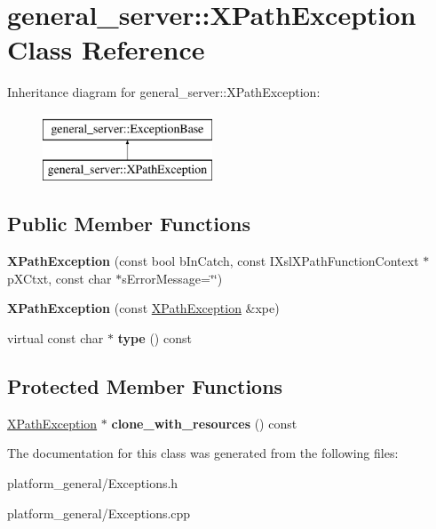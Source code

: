 \hypertarget{classgeneral__server_1_1XPathException}{\section{general\-\_\-server\-:\-:\-X\-Path\-Exception \-Class \-Reference}
\label{classgeneral__server_1_1XPathException}
}
\-Inheritance diagram for general\-\_\-server\-:\-:\-X\-Path\-Exception\-:\begin{figure}[H]
\begin{center}
\leavevmode
\includegraphics[height=2.000000cm]{classgeneral__server_1_1XPathException}
\end{center}
\end{figure}
\subsection*{\-Public \-Member \-Functions}
\begin{DoxyCompactItemize}
\item 
\hypertarget{classgeneral__server_1_1XPathException_a34236687e06c1423e9ea97a372f0600d}{{\bfseries \-X\-Path\-Exception} (const bool b\-In\-Catch, const \-I\-Xsl\-X\-Path\-Function\-Context $\ast$p\-X\-Ctxt, const char $\ast$s\-Error\-Message=\char`\"{}\char`\"{})}\label{classgeneral__server_1_1XPathException_a34236687e06c1423e9ea97a372f0600d}

\item 
\hypertarget{classgeneral__server_1_1XPathException_ac6a03c29ae03bc6cd9f6e11a92aacf98}{{\bfseries \-X\-Path\-Exception} (const \hyperlink{classgeneral__server_1_1XPathException}{\-X\-Path\-Exception} \&xpe)}\label{classgeneral__server_1_1XPathException_ac6a03c29ae03bc6cd9f6e11a92aacf98}

\item 
\hypertarget{classgeneral__server_1_1XPathException_a73aa93289865bd8d29252b618c794178}{virtual const char $\ast$ {\bfseries type} () const }\label{classgeneral__server_1_1XPathException_a73aa93289865bd8d29252b618c794178}

\end{DoxyCompactItemize}
\subsection*{\-Protected \-Member \-Functions}
\begin{DoxyCompactItemize}
\item 
\hypertarget{classgeneral__server_1_1XPathException_a11a6da437ae8ebcf7a77db02cc1823ac}{\hyperlink{classgeneral__server_1_1XPathException}{\-X\-Path\-Exception} $\ast$ {\bfseries clone\-\_\-with\-\_\-resources} () const }\label{classgeneral__server_1_1XPathException_a11a6da437ae8ebcf7a77db02cc1823ac}

\end{DoxyCompactItemize}


\-The documentation for this class was generated from the following files\-:\begin{DoxyCompactItemize}
\item 
platform\-\_\-general/\-Exceptions.\-h\item 
platform\-\_\-general/\-Exceptions.\-cpp\end{DoxyCompactItemize}
